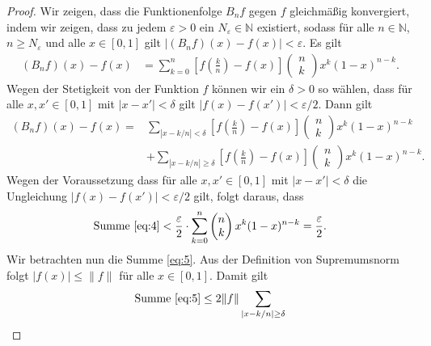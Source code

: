 \documentclass[draft,a5paper]{article}
\begin{document}
\begin{proof}
  Wir zeigen, dass die Funktionenfolge \(B_n f\) gegen \(f\)
  gleichmäßig konvergiert, indem wir zeigen, dass zu jedem
  \(\varepsilon > 0\) ein \(N_{\varepsilon} \in \mathbb{N}\) existiert, sodass
  für alle \(n \in \mathbb{N}\), \(n \ge N_{\varepsilon}\) und alle
  \(x \in [0, 1]\) gilt \(\left| (B_n f)(x) - f(x) \right| < \varepsilon\).
  Es gilt
  \begin{align*}
    (B_n f)(x) - f(x)
    &= \sum_{k = 0}^n {\left[ f \left( \frac{k}{n}
      \right) - f(x) \right]
      \begin{pmatrix} n \\ k \end{pmatrix} x^k (1-x)^{n-k}}.
  \end{align*}
  Wegen der Stetigkeit von der Funktion \(f\) können wir ein \(\delta > 0\)
  so wählen, dass für alle \(x, x' \in [0, 1]\) mit \(|x - x'| < \delta\) gilt
  \(|f(x) - f(x')|< \varepsilon / 2\).  Dann gilt
  \begin{align}
    (B_n f)(x) - f(x) =
    \label{eq:4}
    &\sum_{|x - k/n| < \delta} {\left[ f \left( \frac{k}{n}
      \right) - f(x) \right]
      \begin{pmatrix} n \\ k \end{pmatrix} x^k (1-x)^{n-k}} \\
    \label{eq:5}
    &+ \sum_{|x - k/n| \ge \delta} {\left[ f \left( \frac{k}{n}
      \right) - f(x) \right]
      \begin{pmatrix} n \\ k \end{pmatrix} x^k (1-x)^{n-k}}.
  \end{align}
  Wegen der Voraussetzung dass für alle \(x, x' \in [0, 1]\) mit
  \(|x - x'| < \delta\) die Ungleichung \(|f(x) - f(x')|< \varepsilon / 2\)
  gilt, folgt daraus, dass
  \begin{align*}
    \text{Summe \eqref{eq:4}} < \frac{\varepsilon}{2} \cdot \sum_{k=0}^n
    {\begin{pmatrix} n \\ k \end{pmatrix} x^k (1-x)^{n-k}}
    = \frac{\varepsilon}{2}.
  \end{align*}
  Wir betrachten nun die Summe \eqref{eq:5}.  Aus der Definition von
  Supremumsnorm folgt \(|f(x)| \le \|f\|\) für alle \(x \in [0, 1]\).  Damit
  gilt
  \begin{align*}
    \text{Summe \eqref{eq:5}} \le 2 \|f\|
    \sum_{|x - k/n| \ge \delta}

\end{align*}
\end{proof}
\end{document}
